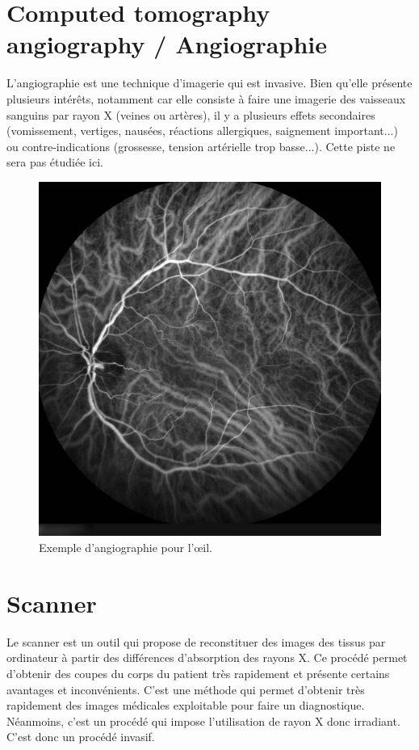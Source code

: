 \section{Computed tomography angiography / Angiographie}

L'angiographie est une technique d'imagerie qui est invasive. Bien qu'elle présente plusieurs intérêts, notamment car elle consiste à faire une imagerie des vaisseaux sanguins par rayon X (veines ou artères), il y a plusieurs effets secondaires (vomissement, vertiges, nausées, réactions allergiques, saignement important...) ou contre-indications (grossesse, tension artérielle trop basse...). Cette piste ne sera pas étudiée ici.

\begin{figure}[H]
\centering
    \includegraphics[scale=0.4,angle=0]{Images/m_1407858437.jpg}
    \caption{Exemple d'angiographie pour l'œil.}
    \label{fig:m_1407858437}
\end{figure}

\section{Scanner}

Le scanner est un outil qui propose de reconstituer des images des tissus par ordinateur à partir des différences d'absorption des rayons X. Ce procédé permet d'obtenir des coupes du corps du patient très rapidement et présente certains avantages et inconvénients. C'est une méthode qui permet d'obtenir très rapidement des images médicales exploitable pour faire un diagnostique. Néanmoins, c'est un procédé qui impose l'utilisation de rayon X donc irradiant. C'est donc un procédé invasif.


